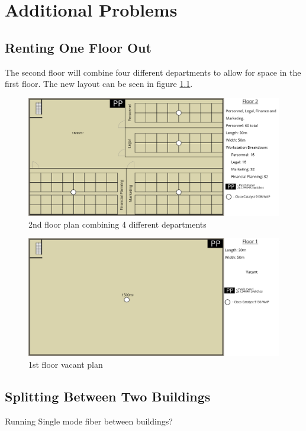 \chapter{Additional Problems}

\section{Renting One Floor Out}

The second floor will combine four different departments to allow for space in the first floor. The new layout can be seen in figure \ref{fig:2nd_floor_varient}.
\begin{figure}[!h]
    \includegraphics[width=15cm]{Figures/2nd-Floor-Varient.png}
    \caption{2nd floor plan combining 4 different departments}
    \label{fig:2nd_floor_varient}
\end{figure}

\begin{figure}[h]
    \includegraphics[width=15cm]{Figures/1st-Floor-varient.png}
    \caption{1st floor vacant plan}
    \label{fig:1st_floor_empty}
\end{figure}

\section{Splitting Between Two Buildings}

Running Single mode fiber between buildings?
